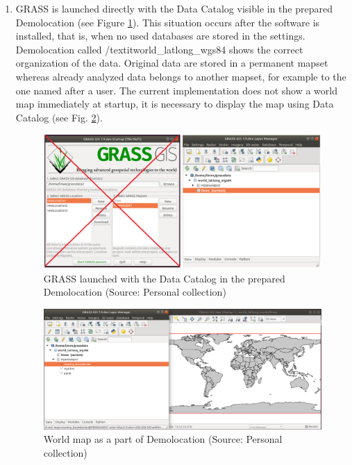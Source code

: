 \documentclass[a4paper,10pt,twoside]{article}
\begin{document}
\begin{enumerate}

\item GRASS is launched directly with the Data Catalog visible in the prepared Demolocation (see Figure \ref{fig:demolocation_startup}). This situation occurs after the software is installed, that is, when no used databases are stored in the settings. Demolocation called /textit{world\_latlong\_wgs84} shows the correct organization of the data. Original data are stored in a permanent mapset whereas already analyzed data belongs to another mapset, for example to the one named after a user. The current implementation does not show a world map immediately at startup, it is necessary to display the map using Data Catalog (see Fig. \ref{fig:demolocation}).

\begin{figure}[hbt!] 
\begin{center}
\includegraphics[width=17cm]{../pictures/demolocation_startup.png} 
\caption[GRASS launched with the Data Catalog in the prepared Demolocation]{GRASS launched with the Data Catalog in the prepared Demolocation (Source: Personal collection)}
\label{fig:demolocation_startup}
\end{center}
\end{figure}

\begin{figure}[hbt!] 
\begin{center}
\includegraphics[width=17cm]{../pictures/demolocation.png} 
\caption[World map as a part of Demolocation]{World map as a part of Demolocation (Source: Personal collection)}
\label{fig:demolocation}
\end{center}
\end{figure}


\end{enumerate}
\end{document}
